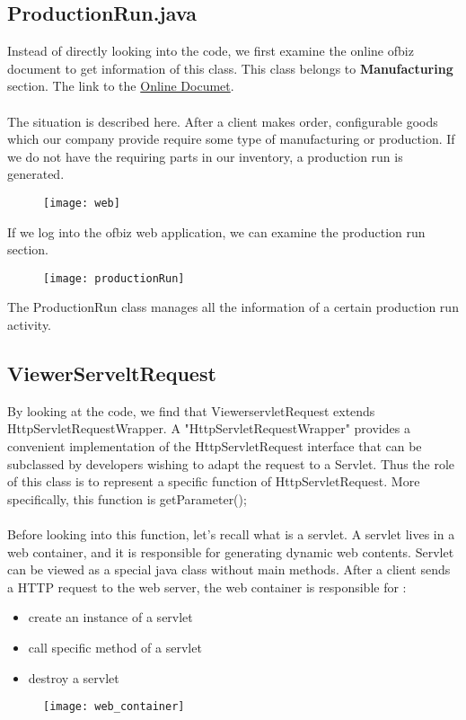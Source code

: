 \documentclass{article}
\begin{document}
 \subsection{ProductionRun.java}
 Instead of directly looking into the code, we first examine the online ofbiz document to get information of this class. This class belongs to \textbf{Manufacturing} section. 
 The link to the 
 \href{https://cwiki.apache.org/confluence/display/OFBIZ/Beginner%27s+Guide+to+the+Manufacturing+Process}{Online Documet}. \\
\\The situation is described here. After a client makes order, configurable goods which our company provide require some type of manufacturing or production. If we do not have the requiring parts in our inventory, a production run is generated.

\begin{figure}[h]
	\centering
	\texttt{[image: web]}
\end{figure}
If we log into the ofbiz web application, we can examine the production run section.
\begin{figure}[h]
	\centering
	\texttt{[image: productionRun]}
\end{figure}
The ProductionRun class manages all the information of a certain production run activity. 
\newpage
 \subsection{ViewerServeltRequest}
 By looking at the code, we find that ViewerservletRequest extends HttpServletRequestWrapper. A "HttpServletRequestWrapper" provides a convenient implementation of the HttpServletRequest interface that can be subclassed by developers wishing to adapt the request to a Servlet. Thus the  role of this class is to represent a specific function of HttpServletRequest. More specifically, this function is getParameter();\\
 \\Before looking into this function, let's recall what is a servlet. A servlet lives in a web container, and it is responsible for generating dynamic web contents. Servlet can be viewed as a special java class without main methods. After a client sends a HTTP request to the web server, the web container is responsible for :
 \begin{itemize}
 	\item create an instance of a servlet
 	\item call specific method of a servlet
 	\item destroy a servlet
 \end{itemize}
\begin{figure}[h]
	\centering
	\texttt{[image: web\_container]}
\end{figure}
\end{document}
